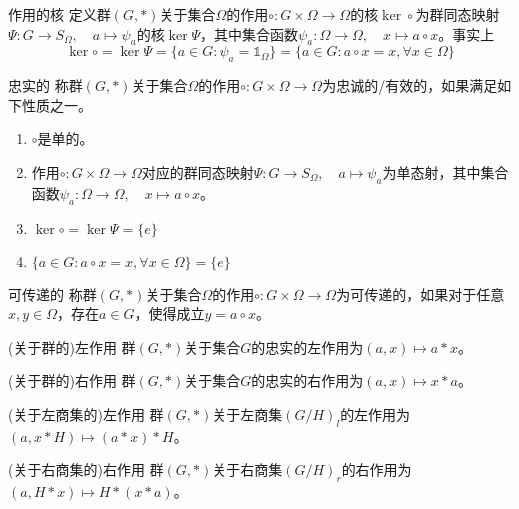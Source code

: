 \documentclass[lang = cn, scheme = chinese, thmcnt = section]{elegantbook}
\begin{document}
\begin{definition}{作用的核}
	定义群$(G,*)$关于集合$\Omega$的作用$\circ:G\times \Omega\to \Omega$的核$\ker\circ$为群同态映射$\Psi:G\to S_{\Omega},\quad a\mapsto \psi_{a}$的核$\ker\Psi$，其中集合函数$\psi_{a}:\Omega\to \Omega,\quad x\mapsto a\circ x$。事实上
	$$
	\ker\circ=\ker\Psi=\{ a\in G:\psi_{a}=\mathbb{1}_\Omega \}=\{ a\in G:a\circ x= x,\forall x\in \Omega \}
	$$
\end{definition}

\begin{definition}{忠实的}
	称群$(G,*)$关于集合$\Omega$的作用$\circ:G\times \Omega\to \Omega$为忠诚的/有效的，如果满足如下性质之一。
	\begin{enumerate}
		\item $\circ$是单的。
		\item 作用$\circ:G\times \Omega\to \Omega$对应的群同态映射$\Psi:G\to S_{\Omega},\quad a\mapsto \psi_{a}$为单态射，其中集合函数$\psi_{a}:\Omega\to \Omega,\quad x\mapsto a\circ x$。
		\item $\ker\circ=\ker\Psi=\{e\}$
		\item $\{ a\in G:a\circ x= x,\forall x\in \Omega \}=\{e\}$
	\end{enumerate}
\end{definition}

\begin{definition}{可传递的}
	称群$(G,*)$关于集合$\Omega$的作用$\circ:G\times \Omega\to \Omega$为可传递的，如果对于任意$x,y\in \Omega$，存在$a\in G$，使得成立$y=a\circ x$。
\end{definition}

\begin{definition}{(关于群的)左作用}
	群$(G,*)$关于集合$G$的忠实的左作用为$(a,x)\mapsto a*x$。
\end{definition}

\begin{definition}{(关于群的)右作用}
	群$(G,*)$关于集合$G$的忠实的右作用为$(a,x)\mapsto x*a$。
\end{definition}

\begin{definition}{(关于左商集的)左作用}
	群$(G,*)$关于左商集$(G/H)_l$的左作用为$(a,x*H)\mapsto (a*x)*H$。
\end{definition}

\begin{definition}{(关于右商集的)右作用}
	群$(G,*)$关于右商集$(G/H)_r$的右作用为$(a,H*x)\mapsto H*(x*a)$。
\end{definition}
\end{document}
